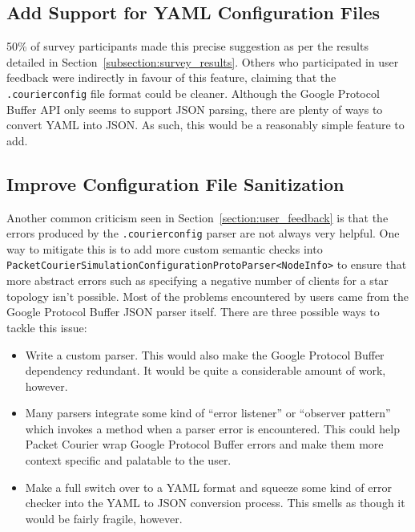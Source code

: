 \subsection{Add Support for YAML Configuration Files}\label{subsection:support_for_yaml_configuration_files}

50\% of survey participants made this precise suggestion as per the results detailed in
Section~\ref{subsection:survey_results}. Others who participated in user feedback were indirectly in favour of this
feature, claiming that the \texttt{.courierconfig} file format could be cleaner. Although the Google Protocol Buffer
API only seems to support JSON parsing\cite{com_google_protobuf_util}, there are plenty of ways to convert YAML into
JSON\cite{yaml_to_json}. As such, this would be a reasonably simple feature to add.

\subsection{Improve Configuration File Sanitization}\label{subsection:improve_configuration_file_sanitization}

Another common criticism seen in Section~\ref{section:user_feedback} is that the errors produced by the
\texttt{.courierconfig} parser are not always very helpful. One way to mitigate this is to add more custom semantic
checks into \texttt{PacketCourierSimulationConfigurationProtoParser<NodeInfo>} to ensure that more abstract errors
such as specifying a negative number of clients for a star topology isn't possible. Most of the problems encountered
by users came from the Google Protocol Buffer JSON parser itself. There are three possible ways to tackle this issue:
\begin{itemize}
    \item Write a custom parser. This would also make the Google Protocol Buffer dependency redundant. It would be
    quite a considerable amount of work, however.
    \item Many parsers integrate some kind of ``error listener'' or ``observer pattern''\cite{observer_pattern} which
    invokes a method when a parser error is encountered. This could help Packet Courier wrap Google Protocol Buffer
    errors and make them more context specific and palatable to the user.
    \item Make a full switch over to a YAML format and squeeze some kind of error checker into the YAML to JSON
    conversion process. This smells as though it would be fairly fragile, however.
\end{itemize}

